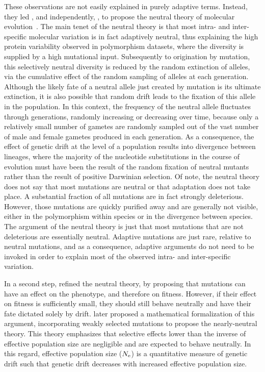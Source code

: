 These observations are not easily explained in purely adaptive terms.
Instead, they led \citet{Kimura1968}, and independently, \citet{King1969}, to propose the neutral theory of molecular evolution~\citep{kimura1986dna, kimura1991neutral}.
The main tenet of the neutral theory is that most intra- and inter-specific molecular variation is in fact adaptively neutral, thus explaining the high protein variability observed in polymorphism datasets, where the diversity is supplied by a high mutational input.
Subsequently to origination by mutation, this selectively neutral diversity is reduced by the random extinction of alleles, via the cumulative effect of the random sampling of alleles at each generation.
Although the likely fate of a neutral allele just created by mutation is its ultimate extinction, it is also possible that random drift leads to the fixation of this allele in the population.
In this context, the frequency of the neutral allele fluctuates through generations, randomly increasing or decreasing over time, because only a relatively small number of gametes are randomly sampled out of the vast number of male and female gametes produced in each generation.
As a consequence, the effect of genetic drift at the level of a population results into divergence between lineages, where the majority of the nucleotide substitutions in the course of evolution must have been the result of the random fixation of neutral mutants rather than the result of positive Darwinian selection.
Of note, the neutral theory does not say that most mutations are neutral or that adaptation does not take place.
A substantial fraction of all mutations are in fact strongly deleterious.
However, those mutations are quickly purified away and are generally not visible, either in the polymorphism within species or in the divergence between species.
The argument of the neutral theory is just that most mutations that are not deleterious are essentially neutral.
Adaptive mutations are just rare, relative to neutral mutations, and as a consequence, adaptive arguments do not need to be invoked in order to explain most of the observed intra- and inter-specific variation.

In a second step, \citet{Ohta1971} refined the neutral theory, by proposing that mutations can have an effect on the phenotype, and therefore on fitness.
However, if their effect on fitness is sufficiently small, they should still behave neutrally and have their fate dictated solely by drift.
\citet{ohta1973slightly} later proposed a mathematical formalization of this argument, incorporating weakly selected mutations to propose the nearly-neutral theory.
This theory emphasizes that selective effects lower than the inverse of effective population size are negligible and are expected to behave neutrally.
In this regard, effective population size ($N_{\textrm{e}}$) is a quantitative measure of genetic drift such that genetic drift decreases with increased effective population size.

